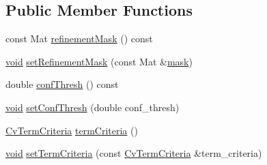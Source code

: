 \subsection*{Public Member Functions}
\begin{DoxyCompactItemize}
\item 
const Mat \hyperlink{classcv_1_1detail_1_1BundleAdjusterBase_aaed5d4280da54b97783b7442ab1c12a0}{refinement\-Mask} () const 
\item 
\hyperlink{legacy_8hpp_a8bb47f092d473522721002c86c13b94e}{void} \hyperlink{classcv_1_1detail_1_1BundleAdjusterBase_aa47bf2d3496b65b3e70b5b43681e5360}{set\-Refinement\-Mask} (const Mat \&\hyperlink{tracking_8hpp_a6b13ecd2fd6ec7ad422f1d7863c3ad19}{mask})
\item 
double \hyperlink{classcv_1_1detail_1_1BundleAdjusterBase_ab6c27eda24c9a237671e2f61c1d2ffe8}{conf\-Thresh} () const 
\item 
\hyperlink{legacy_8hpp_a8bb47f092d473522721002c86c13b94e}{void} \hyperlink{classcv_1_1detail_1_1BundleAdjusterBase_aa5e180dd73dc7ce4fa1627fda01b1bfc}{set\-Conf\-Thresh} (double conf\-\_\-thresh)
\item 
\hyperlink{structCvTermCriteria}{Cv\-Term\-Criteria} \hyperlink{classcv_1_1detail_1_1BundleAdjusterBase_adb910e3347e43a49dc1cb18a06e1f2c0}{term\-Criteria} ()
\item 
\hyperlink{legacy_8hpp_a8bb47f092d473522721002c86c13b94e}{void} \hyperlink{classcv_1_1detail_1_1BundleAdjusterBase_aaf2e8a9fbd52998f8778bd126e393503}{set\-Term\-Criteria} (const \hyperlink{structCvTermCriteria}{Cv\-Term\-Criteria} \&term\-\_\-criteria)
\end{DoxyCompactItemize}
